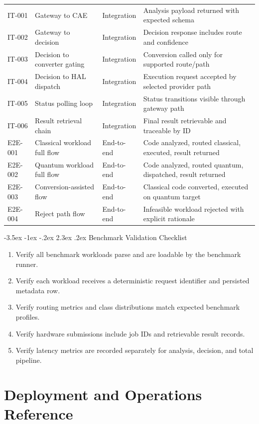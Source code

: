 \documentclass[12pt,a4paper]{report}
\makeatletter
\renewcommand\section{\@startsection{section}{1}{\z@}%
  {-3.5ex \@plus -1ex \@minus -.2ex}%
  {2.3ex \@plus.2ex}%
  {\normalfont\bfseries\fontsize{12pt}{16pt}\selectfont}}
\makeatother
\begin{document}
\begin{longtable}{p{}p{}p{}p{}}
IT-001 & Gateway to CAE & Integration & Analysis payload returned with expected schema \\
IT-002 & Gateway to decision & Integration & Decision response includes route and confidence \\
IT-003 & Decision to converter gating & Integration & Conversion called only for supported route/path \\
IT-004 & Decision to HAL dispatch & Integration & Execution request accepted by selected provider path \\
IT-005 & Status polling loop & Integration & Status transitions visible through gateway path \\
IT-006 & Result retrieval chain & Integration & Final result retrievable and traceable by ID \\
E2E-001 & Classical workload full flow & End-to-end & Code analyzed, routed classical, executed, result returned \\
E2E-002 & Quantum workload full flow & End-to-end & Code analyzed, routed quantum, dispatched, result returned \\
E2E-003 & Conversion-assisted flow & End-to-end & Classical code converted, executed on quantum target \\
E2E-004 & Reject path flow & End-to-end & Infeasible workload rejected with explicit rationale \\
\bottomrule
\end{longtable}
\normalsize

\section{Benchmark Validation Checklist}
\begin{enumerate}
\item Verify all benchmark workloads parse and are loadable by the benchmark runner.
\item Verify each workload receives a deterministic request identifier and persisted metadata row.
\item Verify routing metrics and class distributions match expected benchmark profiles.
\item Verify hardware submissions include job IDs and retrievable result records.
\item Verify latency metrics are recorded separately for analysis, decision, and total pipeline.
\end{enumerate}

\chapter{Deployment and Operations Reference}
\end{document}
